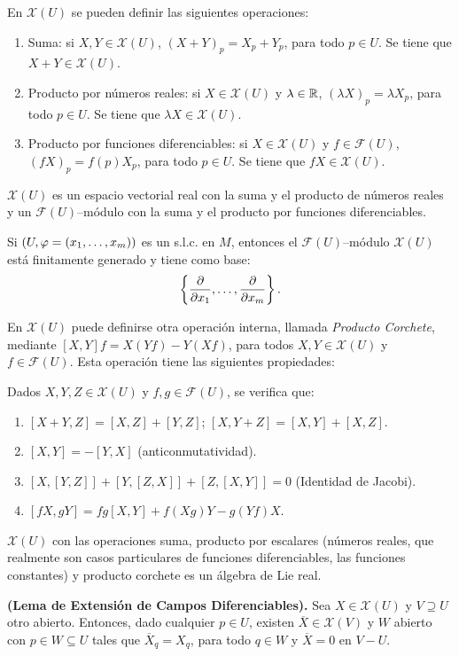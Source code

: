 \documentclass[cursovd_portada.tex]{subfiles}
\begin{document}
En $\mathcal{X}(U)$ se pueden definir las siguientes operaciones:
\begin{enumerate}
\item Suma: si $X,Y\in\mathcal{X}(U)$, $(X+Y)_p=X_p+Y_p$, para todo $p\in U$. Se tiene que $X+Y\in\mathcal{X}(U)$.
\item Producto por números reales: si $X\in\mathcal{X}(U)$ y $\lambda\in\mathbb{R}$, $(\lambda X)_p=\lambda X_p$, para todo
$p\in U$. Se tiene que $\lambda X\in\mathcal{X}(U)$.
\item Producto por funciones diferenciables: si $X\in\mathcal{X}(U)$ y $f\in\mathcal{F}(U)$, $(fX)_p=f(p)X_p$, para todo
$p\in U$. Se tiene que $fX\in\mathcal{X}(U)$.
\end{enumerate}
\begin{prop} $\mathcal{X}(U)$ es un espacio vectorial real con la suma y el producto de números reales y un
$\mathcal{F}(U)$--módulo con la suma y el producto por funciones diferenciables.
\end{prop}
\begin{prop}
Si $(U,\varphi=(x_1,\dots ,x_m))$ es un s.l.c. en $M$, entonces el $\mathcal{F}(U)$--módulo $\mathcal{X}(U)$ está
finitamente generado y tiene como base:
$$\left\{\displaystyle{\frac{\partial}{\partial x_1}},\dots ,\displaystyle{\frac{\partial}{\partial x_m}}\right\}.$$
\end{prop}
En $\mathcal{X}(U)$ puede definirse otra operación interna, llamada {\it Producto Corchete}, mediante
$[X,Y]f=X(Yf)-Y(Xf)$, para todos $X,Y\in\mathcal{X}(U)$ y $f\in\mathcal{F}(U)$. Esta operación tiene las
siguientes propiedades:
\begin{prop}
Dados $X,Y,Z\in\mathcal{X}(U)$ y $f,g\in\mathcal{F}(U)$, se verifica que:
\begin{enumerate}
\item $[X+Y,Z]=[X,Z]+[Y,Z]$; $[X,Y+Z]=[X,Y]+[X,Z]$.
\item $[X,Y]=-[Y,X]$ (anticonmutatividad).
\item $[X,[Y,Z]]+[Y,[Z,X]]+[Z,[X,Y]]=0$ (Identidad de Jacobi).
\item $[fX,gY]=fg[X,Y]+f(Xg)Y-g(Yf)X$.
\end{enumerate}
\end{prop}
\begin{coro}
$\mathcal{X}(U)$ con las operaciones suma, producto por escalares (nú\-me\-ros reales, que realmente son casos
particulares de funciones diferenciables, las funciones constantes) y producto corchete es un álgebra de Lie real.
\end{coro}
\begin{teorema} {\bf (Lema de Extensión de Campos Diferenciables).} Sea $X\in\mathcal{X}(U)$ y $V\supseteq U$ otro abierto.
Entonces, dado cualquier $p\in U$, existen $\overline{X}\in\mathcal{X}(V)$ y $W$ abierto con $p\in W\subseteq U$
tales que $\overline{X}_q=X_q$, para todo $q\in W$ y $\overline{X}=0$ en $V-U$.
\end{teorema}
\end{document}
